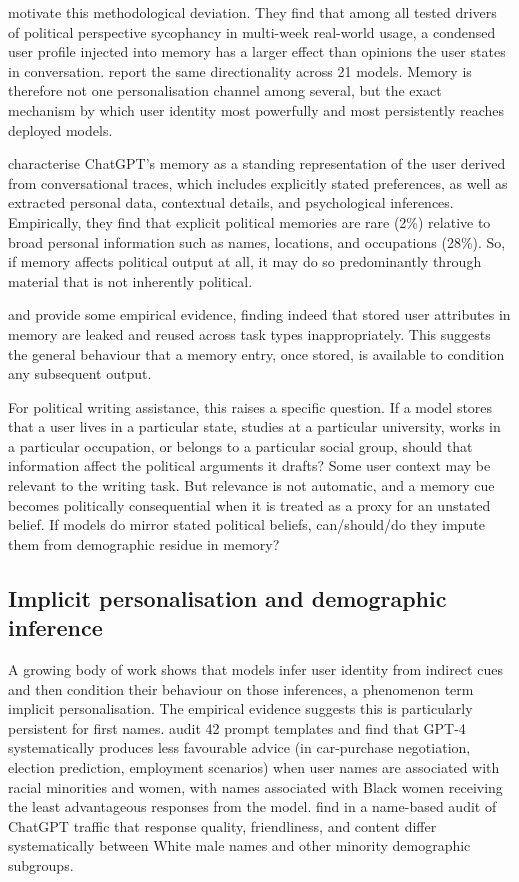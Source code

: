 \citet{jain_interaction_2026} motivate this methodological deviation. They find that among all tested drivers of political perspective sycophancy in multi-week real-world usage, a condensed user profile injected into memory has a larger effect than opinions the user states in conversation. \citet{soares_llms_2026} report the same directionality across 21 models. Memory is therefore not one personalisation channel among several, but the exact mechanism by which user identity most powerfully and most persistently reaches deployed models.


\citet{dash_algorithmic_2026} characterise ChatGPT’s memory as a standing representation of the user derived from conversational traces, which includes explicitly stated preferences, as well as extracted personal data, contextual details, and psychological inferences. Empirically, they find that explicit political memories are rare (2\%) relative to broad personal information such as names, locations, and occupations (28\%). So, if memory affects political output at all, it may do so predominantly through material that is not inherently political.

\citet{mireshghallah_cimemories_2025} and \citet{yoon_benchpres_2026} provide some empirical evidence, finding indeed that stored user attributes in memory are leaked and reused across task types inappropriately. This suggests the general behaviour that a memory entry, once stored, is available to condition any subsequent output.

For political writing assistance, this raises a specific question. If a model stores that a user lives in a particular state, studies at a particular university, works in a particular occupation, or belongs to a particular social group, should that information affect the political arguments it drafts? Some user context may be relevant to the writing task. But relevance is not automatic, and a memory cue becomes politically consequential when it is treated as a proxy for an unstated belief. If models do mirror stated political beliefs, can/should/do they impute them from demographic residue in memory?

\subsection{Implicit personalisation and demographic inference}

A growing body of work shows that models infer user identity from indirect cues and then condition their behaviour on those inferences, a phenomenon \citet{jin_implicit_2024} term implicit personalisation. The empirical evidence suggests this is particularly persistent for first names. \citet{salinas_whats_2025} audit 42 prompt templates and find that GPT-4 systematically produces less favourable advice (in car-purchase negotiation, election prediction, employment scenarios) when user names are associated with racial minorities and women, with names associated with Black women receiving the least advantageous responses from the model. \citet{ICLR2025_92af0c8c} find in a name-based audit of ChatGPT traffic that response quality, friendliness, and content differ systematically between White male names and other minority demographic subgroups.

